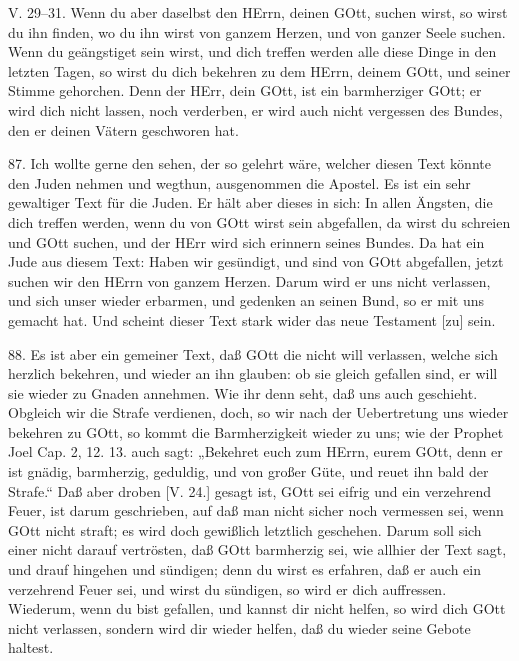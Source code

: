 \begin{schriftzitat}
V. 29–31. Wenn du aber daselbst den HErrn, deinen GOtt, suchen wirst, so wirst du ihn finden, wo du ihn wirst von ganzem Herzen, und von ganzer Seele suchen. Wenn du geängstiget sein wirst, und dich treffen werden alle diese Dinge in den letzten Tagen, so wirst du dich bekehren zu dem HErrn, deinem GOtt, und seiner Stimme gehorchen. Denn der HErr, dein GOtt, ist ein barmherziger GOtt; er wird dich nicht lassen, noch verderben, er wird auch nicht vergessen des Bundes, den er deinen Vätern geschworen hat.
\end{schriftzitat}

87. Ich wollte gerne den sehen, der so gelehrt wäre, welcher diesen Text könnte den Juden nehmen und wegthun, ausgenommen die Apostel. Es ist ein sehr gewaltiger Text für die Juden. Er hält aber dieses in sich: In allen Ängsten, die dich treffen werden, wenn du von GOtt wirst sein abgefallen, da wirst du schreien und GOtt suchen, und der HErr wird sich erinnern seines Bundes. Da hat ein Jude aus diesem Text: Haben wir gesündigt, und sind von GOtt abgefallen, jetzt suchen wir den HErrn von ganzem Herzen. Darum wird er uns nicht verlassen, und sich unser wieder erbarmen, und gedenken an seinen Bund, so er mit uns gemacht hat. Und scheint dieser Text stark wider das neue Testament [zu] sein.

88. Es ist aber ein gemeiner Text, daß GOtt die nicht will verlassen, welche sich herzlich bekehren, und wieder an ihn glauben: ob sie gleich gefallen sind, er will sie wieder zu Gnaden annehmen. Wie ihr denn seht, daß uns auch geschieht. Obgleich wir die Strafe verdienen, doch, so wir nach der Uebertretung uns wieder bekehren zu GOtt, so kommt die Barmherzigkeit wieder zu uns; wie der Prophet Joel Cap. 2, 12. 13. auch sagt: „Bekehret euch zum HErrn, eurem GOtt, denn er ist gnädig, barmherzig, geduldig, und von großer Güte, und reuet ihn bald der Strafe.“ Daß aber droben [V. 24.] gesagt ist, GOtt sei eifrig und ein verzehrend Feuer, ist darum geschrieben, auf daß man nicht sicher noch vermessen sei, wenn GOtt nicht straft; es wird doch gewißlich letztlich geschehen. Darum soll sich einer nicht darauf vertrösten, daß GOtt barmherzig sei, wie allhier der Text sagt, und drauf hingehen und sündigen; denn du wirst es erfahren, daß er auch ein verzehrend Feuer sei, und wirst du sündigen, so wird er dich auffressen. Wiederum, wenn du bist gefallen, und kannst dir nicht helfen, so wird dich GOtt nicht verlassen, sondern wird dir wieder helfen, daß du wieder seine Gebote haltest.

